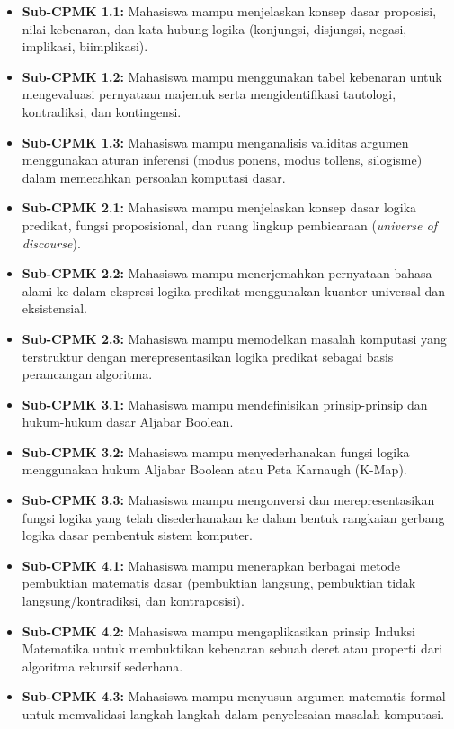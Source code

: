 \documentclass[12pt,a4paper]{article}
\begin{document}
\begin{itemize}[leftmargin=*]
  \item \textbf{Sub-CPMK 1.1:} Mahasiswa mampu menjelaskan konsep dasar proposisi, nilai kebenaran, dan kata hubung logika (konjungsi, disjungsi, negasi, implikasi, biimplikasi).
  \item \textbf{Sub-CPMK 1.2:} Mahasiswa mampu menggunakan tabel kebenaran untuk mengevaluasi pernyataan majemuk serta mengidentifikasi tautologi, kontradiksi, dan kontingensi.
  \item \textbf{Sub-CPMK 1.3:} Mahasiswa mampu menganalisis validitas argumen menggunakan aturan inferensi (modus ponens, modus tollens, silogisme) dalam memecahkan persoalan komputasi dasar.
  
  \item \textbf{Sub-CPMK 2.1:} Mahasiswa mampu menjelaskan konsep dasar logika predikat, fungsi proposisional, dan ruang lingkup pembicaraan (\textit{universe of discourse}).
  \item \textbf{Sub-CPMK 2.2:} Mahasiswa mampu menerjemahkan pernyataan bahasa alami ke dalam ekspresi logika predikat menggunakan kuantor universal dan eksistensial.
  \item \textbf{Sub-CPMK 2.3:} Mahasiswa mampu memodelkan masalah komputasi yang terstruktur dengan merepresentasikan logika predikat sebagai basis perancangan algoritma.
  
  \item \textbf{Sub-CPMK 3.1:} Mahasiswa mampu mendefinisikan prinsip-prinsip dan hukum-hukum dasar Aljabar Boolean.
  \item \textbf{Sub-CPMK 3.2:} Mahasiswa mampu menyederhanakan fungsi logika menggunakan hukum Aljabar Boolean atau Peta Karnaugh (K-Map).
  \item \textbf{Sub-CPMK 3.3:} Mahasiswa mampu mengonversi dan merepresentasikan fungsi logika yang telah disederhanakan ke dalam bentuk rangkaian gerbang logika dasar pembentuk sistem komputer.
  
  \item \textbf{Sub-CPMK 4.1:} Mahasiswa mampu menerapkan berbagai metode pembuktian matematis dasar (pembuktian langsung, pembuktian tidak langsung/kontradiksi, dan kontraposisi).
  \item \textbf{Sub-CPMK 4.2:} Mahasiswa mampu mengaplikasikan prinsip Induksi Matematika untuk membuktikan kebenaran sebuah deret atau properti dari algoritma rekursif sederhana.
  \item \textbf{Sub-CPMK 4.3:} Mahasiswa mampu menyusun argumen matematis formal untuk memvalidasi langkah-langkah dalam penyelesaian masalah komputasi.
\end{itemize}
\end{document}
